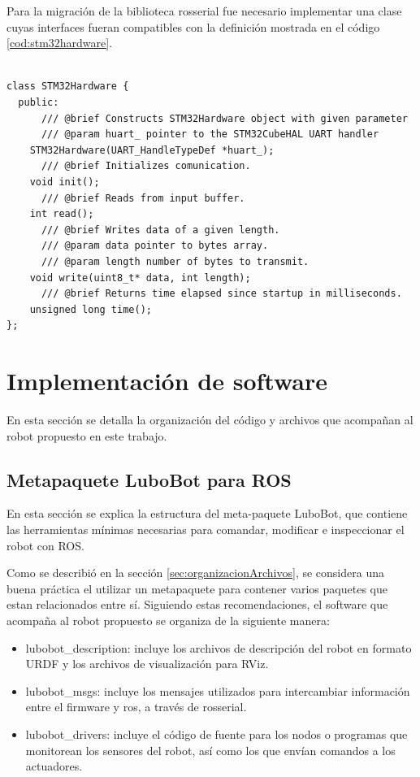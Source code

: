 Para la migración de la biblioteca rosserial fue necesario implementar una clase cuyas interfaces fueran compatibles con la definición mostrada en el código \ref{cod:stm32hardware}.

\begin{lstlisting}[label=cod:stm32hardware, caption=Interfaz de la clase STM32Hardware requerida por la biblioteca rosserial.\protect\footnotemark]

class STM32Hardware {
  public:
	  /// @brief Constructs STM32Hardware object with given parameter
	  /// @param huart_ pointer to the STM32CubeHAL UART handler
    STM32Hardware(UART_HandleTypeDef *huart_);
	  /// @brief Initializes comunication.
    void init();
	  /// @brief Reads from input buffer.
    int read();
	  /// @brief Writes data of a given length.
	  /// @param data pointer to bytes array.
	  /// @param length number of bytes to transmit.
    void write(uint8_t* data, int length);
	  /// @brief Returns time elapsed since startup in milliseconds.
    unsigned long time();
};

\end{lstlisting}


\section{Implementación de software}

En esta sección se detalla la organización del código y archivos que acompañan al robot propuesto en este trabajo.

\subsection{Metapaquete LuboBot para ROS}

En esta sección se explica la estructura del meta-paquete LuboBot, que contiene las herramientas mínimas necesarias para comandar, modificar e inspeccionar el robot con ROS.

Como se describió en la sección \ref{sec:organizacionArchivos}, se considera una buena práctica el utilizar un metapaquete para contener varios paquetes que estan relacionados entre sí. Siguiendo estas recomendaciones, el software que acompaña al robot propuesto se organiza de la siguiente manera:

\begin{itemize}
  \item lubobot\_description: incluye los archivos de descripción del robot en formato URDF y los archivos de visualización para RViz.
  \item lubobot\_msgs: incluye los mensajes utilizados para intercambiar información entre el firmware y ros, a través de rosserial.
  \item lubobot\_drivers: incluye el código de fuente para los nodos o programas que monitorean los sensores del robot, así como los que envían comandos a los actuadores.
\end{itemize}

